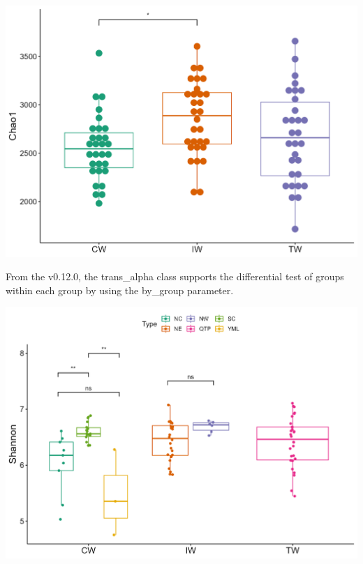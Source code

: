 \documentclass[
]{book}
\newenvironment{Shaded}{\begin{snugshade}}{\end{snugshade}}
\newcommand{\AttributeTok}[1]{\textcolor[rgb]{0.77,0.63,0.00}{#1}}
\newcommand{\FunctionTok}[1]{\textcolor[rgb]{0.00,0.00,0.00}{#1}}
\newcommand{\NormalTok}[1]{#1}
\newcommand{\OtherTok}[1]{\textcolor[rgb]{0.56,0.35,0.01}{#1}}
\newcommand{\SpecialCharTok}[1]{\textcolor[rgb]{0.00,0.00,0.00}{#1}}
\newcommand{\StringTok}[1]{\textcolor[rgb]{0.31,0.60,0.02}{#1}}
\begin{document}
\begin{center}\includegraphics[width=600px]{Images/trans_alpha_wilcox_nons} \end{center}

From the v0.12.0, the trans\_alpha class supports the differential test of groups within each group by using the by\_group parameter.

\begin{Shaded}
\end{Shaded}

\begin{center}\includegraphics[width=600px]{Images/trans_alpha_wilcox_bygroup} \end{center}
\end{document}
